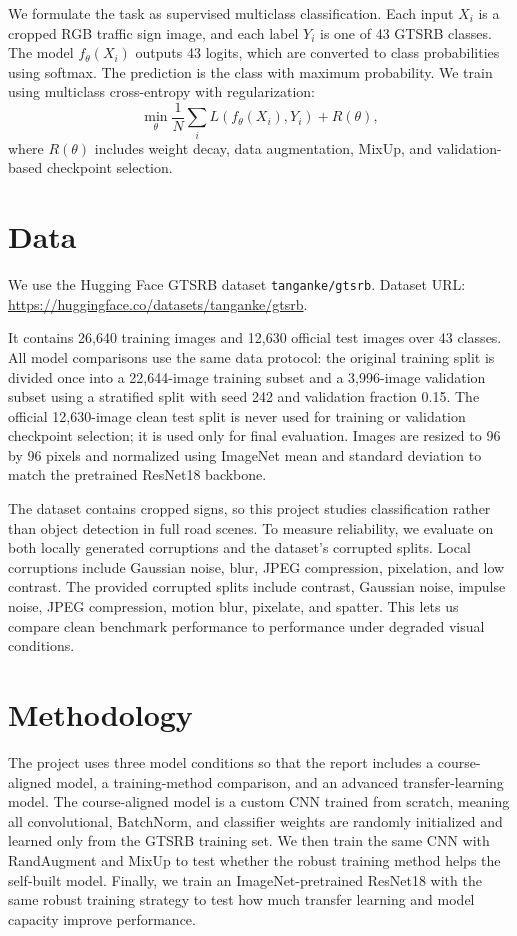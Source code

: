 \documentclass[12pt,letterpaper]{article}
\begin{document}
We formulate the task as supervised multiclass classification. Each input $X_i$ is a cropped RGB traffic sign image, and each label $Y_i$ is one of 43 GTSRB classes. The model $f_\theta(X_i)$ outputs 43 logits, which are converted to class probabilities using softmax. The prediction is the class with maximum probability. We train using multiclass cross-entropy with regularization:
\[
\min_\theta \frac{1}{N}\sum_i L(f_\theta(X_i),Y_i)+R(\theta),
\]
where $R(\theta)$ includes weight decay, data augmentation, MixUp, and validation-based checkpoint selection.

\section{Data}
We use the Hugging Face GTSRB dataset \texttt{tanganke/gtsrb}. Dataset URL: \url{https://huggingface.co/datasets/tanganke/gtsrb}.

It contains 26,640 training images and 12,630 official test images over 43 classes. All model comparisons use the same data protocol: the original training split is divided once into a 22,644-image training subset and a 3,996-image validation subset using a stratified split with seed 242 and validation fraction 0.15. The official 12,630-image clean test split is never used for training or validation checkpoint selection; it is used only for final evaluation. Images are resized to 96 by 96 pixels and normalized using ImageNet mean and standard deviation to match the pretrained ResNet18 backbone.

The dataset contains cropped signs, so this project studies classification rather than object detection in full road scenes. To measure reliability, we evaluate on both locally generated corruptions and the dataset's corrupted splits. Local corruptions include Gaussian noise, blur, JPEG compression, pixelation, and low contrast. The provided corrupted splits include contrast, Gaussian noise, impulse noise, JPEG compression, motion blur, pixelate, and spatter. This lets us compare clean benchmark performance to performance under degraded visual conditions.

\section{Methodology}
The project uses three model conditions so that the report includes a course-aligned model, a training-method comparison, and an advanced transfer-learning model. The course-aligned model is a custom CNN trained from scratch, meaning all convolutional, BatchNorm, and classifier weights are randomly initialized and learned only from the GTSRB training set. We then train the same CNN with RandAugment and MixUp to test whether the robust training method helps the self-built model. Finally, we train an ImageNet-pretrained ResNet18 with the same robust training strategy to test how much transfer learning and model capacity improve performance.
\end{document}
